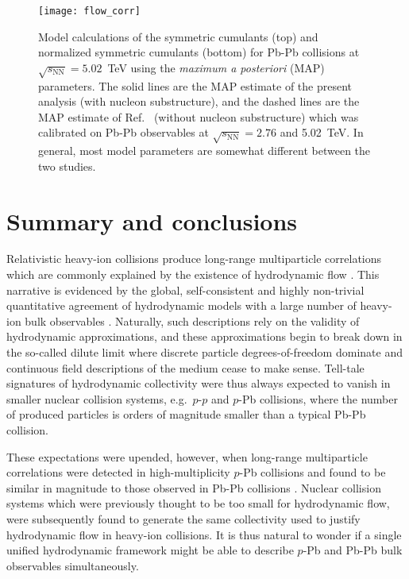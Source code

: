 \documentclass[aps,prc,reprint,amsmath,nofootinbib]{revtex4-1}
\newcommand{\sqrts}{\sqrt{s_\mathrm{NN}}}
\begin{document}
\begin{figure}
  \texttt{[image: flow\_corr]}
  \caption{
    \label{fig:flow_corr}
    Model calculations of the symmetric cumulants (top) and normalized symmetric cumulants (bottom) for Pb-Pb collisions at $\sqrts=5.02$~TeV using the \emph{maximum a posteriori} (MAP) parameters.
    The solid lines are the MAP estimate of the present analysis (with nucleon substructure), and the dashed lines are the MAP estimate of Ref.~\cite{Bernhard:2018hnz} (without nucleon substructure) which was calibrated on Pb-Pb observables at $\sqrts=2.76$ and 5.02~TeV.
    In general, most model parameters are somewhat different between the two studies.
  }
\end{figure}


\section{Summary and conclusions}
\label{sec:summary}

Relativistic heavy-ion collisions produce long-range multiparticle correlations which are commonly explained by the existence of hydrodynamic flow \cite{deSouza:2015ena}.
This narrative is evidenced by the global, self-consistent and highly non-trivial quantitative agreement of hydrodynamic models with a large number of heavy-ion bulk observables \cite{Niemi:2015qia, Bernhard:2016tnd, Gale:2012rq}.
Naturally, such descriptions rely on the validity of hydrodynamic approximations, and these approximations begin to break down in the so-called dilute limit where discrete particle degrees-of-freedom dominate and continuous field descriptions of the medium cease to make sense.
Tell-tale signatures of hydrodynamic collectivity were thus always expected to vanish in smaller nuclear collision systems, e.g.\ $p$-$p$ and $p$-Pb collisions, where the number of produced particles is orders of magnitude smaller than a typical Pb-Pb collision.

These expectations were upended, however, when long-range multiparticle correlations were detected in high-multiplicity $p$-Pb collisions and found to be similar in magnitude to those observed in Pb-Pb collisions \cite{CMS:2012qk, Abelev:2012ola, Aad:2012gla}.
Nuclear collision systems which were previously thought to be too small for hydrodynamic flow, were subsequently found to generate the same collectivity used to justify hydrodynamic flow in heavy-ion collisions.
It is thus natural to wonder if a single unified hydrodynamic framework might be able to describe $p$-Pb and Pb-Pb bulk observables simultaneously.
\end{document}
